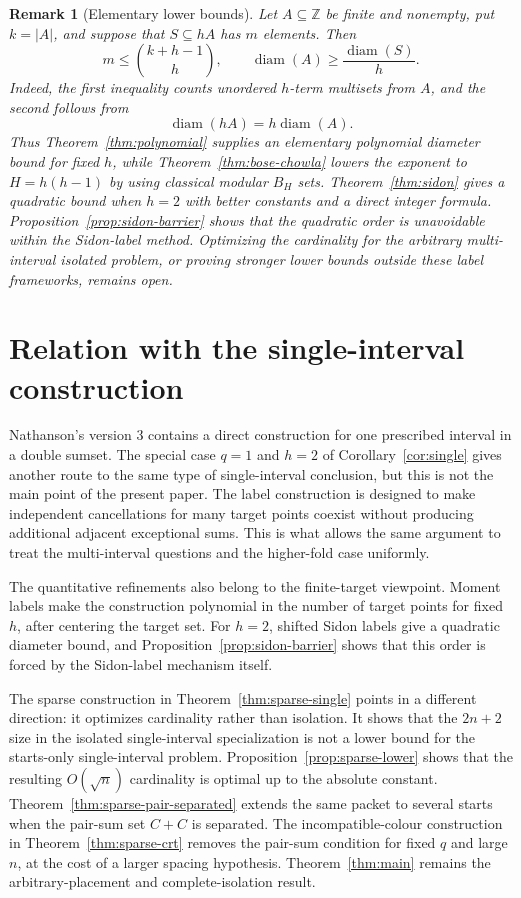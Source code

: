 \documentclass[11pt]{article}
\newtheorem{remark}{Remark}
\newcommand{\Z}{\mathbb{Z}}
\begin{document}
\begin{remark}[Elementary lower bounds]\label{rem:lower-bounds}
Let $A\subseteq\Z$ be finite and nonempty, put $k=|A|$, and suppose that
$S\subseteq hA$ has $m$ elements. Then
\[
 m\leq \binom{k+h-1}{h},
 \qquad
 \operatorname{diam}(A)\geq \frac{\operatorname{diam}(S)}{h}.
\]
Indeed, the first inequality counts unordered $h$-term multisets from $A$,
and the second follows from
\[
 \operatorname{diam}(hA)=h\operatorname{diam}(A).
\]
Thus Theorem~\ref{thm:polynomial} supplies an elementary polynomial diameter
bound for fixed $h$, while Theorem~\ref{thm:bose-chowla} lowers the exponent
to $H=h(h-1)$ by using classical modular $B_H$ sets. Theorem~\ref{thm:sidon}
gives a quadratic bound when $h=2$ with better constants and a direct
integer formula. Proposition~\ref{prop:sidon-barrier} shows that the
quadratic order is unavoidable within the Sidon-label method. Optimizing the
cardinality for the arbitrary multi-interval isolated problem, or proving
stronger lower bounds outside these label frameworks, remains open.
\end{remark}

\section{Relation with the single-interval construction}

Nathanson's version 3 contains a direct construction for one prescribed
interval in a double sumset. The special case $q=1$ and $h=2$ of
Corollary~\ref{cor:single} gives another route to the same type of
single-interval conclusion, but this is not the main point of the present
paper. The label construction is designed to make independent cancellations
for many target points coexist without producing additional adjacent
exceptional sums. This is what allows the same argument to treat the
multi-interval questions and the higher-fold case uniformly.

The quantitative refinements also belong to the finite-target viewpoint.
Moment labels make the construction polynomial in the number of target
points for fixed $h$, after centering the target set. For $h=2$, shifted
Sidon labels give a quadratic diameter bound, and
Proposition~\ref{prop:sidon-barrier} shows that this order is forced by the
Sidon-label mechanism itself.

The sparse construction in Theorem~\ref{thm:sparse-single} points in a
different direction: it optimizes cardinality rather than isolation. It shows
that the $2n+2$ size in the isolated single-interval specialization is not a
lower bound for the starts-only single-interval problem.
Proposition~\ref{prop:sparse-lower} shows that the resulting $O(\sqrt n)$
cardinality is optimal up to the absolute constant.
Theorem~\ref{thm:sparse-pair-separated} extends the same packet to several
starts when the pair-sum set $C+C$ is separated. The incompatible-colour
construction in Theorem~\ref{thm:sparse-crt} removes the pair-sum condition
for fixed $q$ and large $n$, at the cost of a larger spacing hypothesis.
Theorem~\ref{thm:main} remains the arbitrary-placement and complete-isolation
result.
\end{document}
